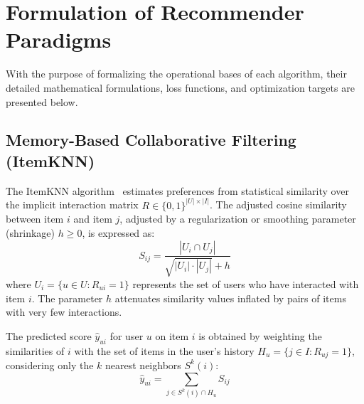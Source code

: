 \documentclass[journal]{IEEEtran}
\begin{document}
\section{Formulation of Recommender Paradigms}
\label{sec:paradigms}

With the purpose of formalizing the operational bases of each algorithm, their detailed mathematical formulations, loss functions, and optimization targets are presented below.

\subsection{Memory-Based Collaborative Filtering (ItemKNN)}
The ItemKNN algorithm~\cite{sarwar2001item} estimates preferences from statistical similarity over the implicit interaction matrix $R \in \{0, 1\}^{|U| \times |I|}$. The adjusted cosine similarity between item $i$ and item $j$, adjusted by a regularization or smoothing parameter (shrinkage) $h \ge 0$, is expressed as:
\begin{equation}
S_{ij} = \frac{|U_i \cap U_j|}{\sqrt{|U_i| \cdot |U_j|} + h}
\end{equation}
where $U_i = \{u \in U : R_{ui} = 1\}$ represents the set of users who have interacted with item $i$. The parameter $h$ attenuates similarity values inflated by pairs of items with very few interactions.

The predicted score $\hat{y}_{ui}$ for user $u$ on item $i$ is obtained by weighting the similarities of $i$ with the set of items in the user's history $H_u = \{j \in I : R_{uj} = 1\}$, considering only the $k$ nearest neighbors $S^k(i)$:
\begin{equation}
\hat{y}_{ui} = \sum_{j \in S^k(i) \cap H_u} S_{ij}
\end{equation}
\end{document}
